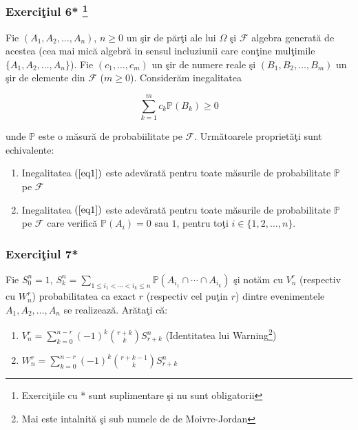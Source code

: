 \documentclass[]{article}
\def\Om{\Omega}
\def\PP{{\mathbb P}}
\def\MF{{\mathcal F}}
\let\rmarkdownfootnote\footnote%
\def\footnote{\protect\rmarkdownfootnote}
\begin{document}
\subsubsection[Exerci\c tiul 6* ]{\texorpdfstring{Exerci\c tiul 6*
\footnote{Exerci\c tiile cu * sunt suplimentare \c si nu sunt
  obligatorii}}{Exerciiul 6* }}\label{exerciiul-6}

Fie \((A_1, A_2, \dots, A_n)\), \(n\geq0\) un \c sir de p\u ar\c ti ale
lui \(\Om\) \c si \(\MF\) algebra generat\u a de acestea (cea mai
mic\u a algebr\u a in sensul incluziunii care con\c tine mul\c timile
\(\{A_1, A_2, \dots, A_n\}\)). Fie \((c_1, \dots,c_m)\) un \c sir de
numere reale \c si \((B_1, B_2, \dots, B_m)\) un \c sir de elemente din
\(\MF\) (\(m\geq 0\)). Consider\u am inegalitatea

\begin{equation}\label{eq1}
  \displaystyle\sum_{k=1}^{m}c_k\PP(B_k)\geq 0
\end{equation}

unde \(\PP\) este o m\u asur\u a de probabiilitate pe \(\MF\).
Urm\u atoarele propriet\u a\c ti sunt echivalente:

\begin{enumerate}
\def\labelenumi{\alph{enumi})}
\item
  Inegalitatea \((\ref{eq1})\) este adev\u arat\u a pentru toate
  m\u asurile de probabilitate \(\PP\) pe \(\MF\)
\item
  Inegalitatea \((\ref{eq1})\) este adev\u arat\u a pentru toate
  m\u asurile de probabilitate \(\PP\) pe \(\MF\) care verific\u a
  \(\PP(A_i)=0\) sau \(1\), pentru to\c ti \(i\in\{1,2,\dots,n\}\).
\end{enumerate}

\subsubsection{\texorpdfstring{Exerci\c tiul
7*}{Exerciiul 7*}}\label{exerciiul-7}

Fie \(S_{0}^{n}=1\),
\(S_{k}^{n}=\displaystyle\sum_{1\leq i_1<\cdots<i_k\leq n}\PP\left(A_{i_1}\cap\cdots\cap A_{i_k}\right)\)
\c si not\u am cu \(V_{n}^{r}\) (respectiv cu \(W_{n}^{r}\))
probabilitatea ca exact \(r\) (respectiv cel pu\c tin \(r\)) dintre
evenimentele \(A_1, A_2, \dots, A_n\) se realizeaz\u a. Ar\u ata\c ti
c\u a:

\begin{enumerate}
\def\labelenumi{\alph{enumi})}
\item
  \(V_{n}^{r}=\displaystyle\sum_{k=0}^{n-r}(-1)^k\binom{r+k}{k}S_{r+k}^{n}\)
  (Identitatea lui Warning\footnote{Mai este intalnit\u a \c si sub
    numele de de Moivre-Jordan})
\item
  \(W_{n}^{r}=\displaystyle\sum_{k=0}^{n-r}(-1)^k\binom{r+k-1}{k}S_{r+k}^{n}\)
\end{enumerate}
\end{document}
